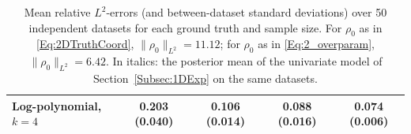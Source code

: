 \begin{table}[H]
\begin{tabular}{l|cccc}
	Log-polynomial, $k=4$ & 0.203 (0.040) & 0.106 (0.014) & 0.088 (0.016) & 0.074 (0.006) \\
	\hline
	\end{tabular}
\caption{Mean relative $L^2$-errors (and between-dataset standard deviations) over 50 independent datasets for each ground truth and sample size. For $\rho_0$ as in \eqref{Eq:2DTruthCoord}, $\|\rho_0\|_{L^2} = 11.12$; for $\rho_0$ as in \eqref{Eq:2_overparam}, $\|\rho_0\|_{L^2} = 6.42$. In italics: the posterior mean of the univariate model of Section~\ref{Subsec:1DExp} on the same datasets.}
\label{Tab:2DResultsCoord}
\end{table}%

